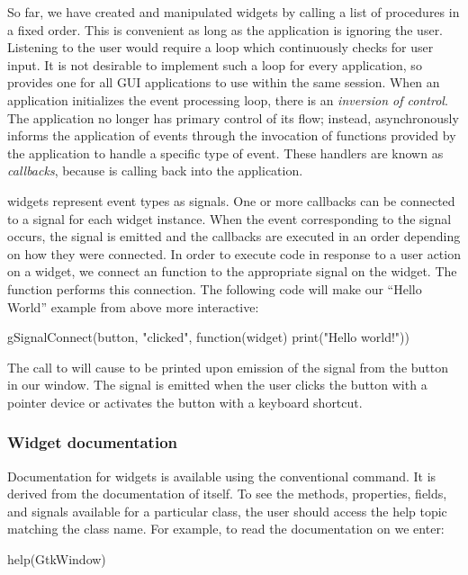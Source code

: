 \documentclass[article,shortnames]{jss}
\begin{document}
So far, we have created and manipulated widgets by calling a list of
procedures in a fixed order. This is convenient as long as the
application is ignoring the user. Listening to the user would require
a loop which continuously checks for user input.  It is not desirable
to implement such a loop for every application, so  provides
one for all GUI applications to use within the same 
session. When an
application initializes the  event processing loop, there is
an \emph{inversion of control}. The application no longer has primary
control of its flow; instead,  asynchronously informs the
application of events through the invocation of functions provided by
the application to handle a specific type of event. These handlers are
known as \emph{callbacks}, because  is calling back into the
application.

 widgets represent event types as signals. One or more
callbacks can be connected to a signal for each widget instance. When
the event corresponding to the signal occurs, the signal is emitted
and the callbacks are executed in an order depending on how they were
connected. In order to execute  code in response to a user
action on a widget, we connect an  function to the
appropriate signal on the widget.  The  function
performs this connection. The following code will make our ``Hello
World'' example from above more interactive:  
\begin{Code}
gSignalConnect(button, "clicked", 
               function(widget) print("Hello world!"))
\end{Code}
The call to
 will cause  to be printed
upon emission of the  signal from the button in our
window.  The
 signal is emitted when the user clicks the button with
a pointer device or activates the button with a keyboard shortcut.

\subsubsection{Widget documentation}

Documentation for widgets is available using the conventional
 command. It is derived from the documentation of
 itself.
To see the methods, properties, fields, and signals available
for a particular class, the user should access the help topic matching
the class name.
For example, to read the documentation on  we enter:
\begin{Code}
help(GtkWindow)
\end{Code}
\end{document}
